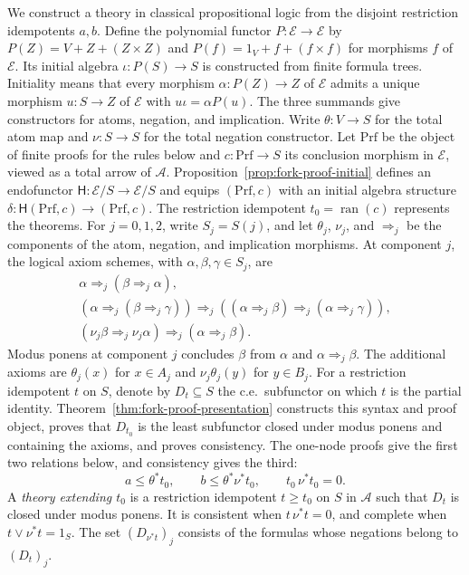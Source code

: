 \documentclass[11pt]{article}
\newcommand{\ran}{\operatorname{ran}}
\begin{document}
We construct a theory in classical propositional logic from the
disjoint restriction idempotents $a,b$. Define the polynomial functor
$P:\mathcal E\to\mathcal E$ by
$P(Z)=V+Z+(Z\times Z)$ and
$P(f)=1_V+f+(f\times f)$ for morphisms $f$ of $\mathcal E$.
Its initial algebra $\iota:P(S)\to S$ is constructed from finite
formula trees. Initiality means that every morphism
$\alpha:P(Z)\to Z$ of $\mathcal E$ admits a unique morphism $u:S\to Z$
of $\mathcal E$
with $u\iota=\alpha P(u)$.
The three summands give constructors for atoms, negation, and implication.
Write $\theta:V\to S$ for the total atom map
and $\nu:S\to S$ for the total negation constructor.
Let $\mathrm{Prf}$ be the object of finite proofs for the rules below
and $c:\mathrm{Prf}\to S$ its conclusion morphism in $\mathcal E$,
viewed as a total arrow of $\mathcal A$.
Proposition~\ref{prop:fork-proof-initial} defines an endofunctor
$\mathsf H:\mathcal E/S\to\mathcal E/S$ and equips $(\mathrm{Prf},c)$
with an initial algebra structure
$\delta:\mathsf H(\mathrm{Prf},c)\to(\mathrm{Prf},c)$.
The restriction idempotent $t_0=\ran(c)$ represents the theorems.
For $j=0,1,2$, write $S_j=S(j)$, and let $\theta_j$, $\nu_j$,
and $\Rightarrow_j$ be the components of the atom, negation,
and implication morphisms. At component $j$, the logical axiom
schemes, with $\alpha,\beta,\gamma\in S_j$, are
\[
\begin{gathered}
 \alpha\Rightarrow_j(\beta\Rightarrow_j\alpha),\\
 (\alpha\Rightarrow_j(\beta\Rightarrow_j\gamma))
   \Rightarrow_j((\alpha\Rightarrow_j\beta)\Rightarrow_j
                         (\alpha\Rightarrow_j\gamma)),\\
 (\nu_j\beta\Rightarrow_j\nu_j\alpha)
       \Rightarrow_j(\alpha\Rightarrow_j\beta).
\end{gathered}
\]
Modus ponens at component $j$ concludes $\beta$ from $\alpha$
and $\alpha\Rightarrow_j\beta$. The additional axioms are
$\theta_j(x)$ for $x\in A_j$ and $\nu_j\theta_j(y)$ for $y\in B_j$.
For a restriction idempotent $t$ on $S$, denote by $D_t\subseteq S$
the c.e.\ subfunctor on which $t$ is the partial identity.
Theorem~\ref{thm:fork-proof-presentation} constructs this syntax and
proof object, proves that $D_{t_0}$ is the least
subfunctor closed under modus ponens and containing the axioms, and proves
consistency. The one-node proofs give the first two relations below,
and consistency gives the third:
\begin{equation}\label{eq:atomic-inequalities}
 a\le\theta^*t_0,\qquad
 b\le\theta^*\nu^*t_0,\qquad t_0\,\nu^*t_0=0.
\end{equation}
A \emph{theory extending $t_0$} is a restriction idempotent $t\ge t_0$
on $S$ in $\mathcal A$ such that $D_t$ is closed under modus ponens.
It is consistent when $t\,\nu^*t=0$, and complete when
$t\vee\nu^*t=1_S$. The set $(D_{\nu^*t})_j$ consists of the
formulas whose negations belong to $(D_t)_j$.
\end{document}
